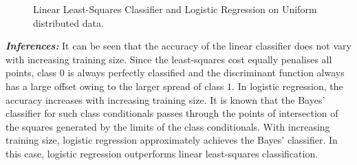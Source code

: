 \documentclass[12pt, a4 paper]{article}
\begin{document}
\begin{figure}

\caption{Linear Least-Squares Classifier and Logistic Regression on Uniform distributed data.}
\label{fig:LS_LOG_Uniform}
\end{figure}

{\it \bfseries Inferences:} It can be seen that the accuracy of the linear classifier does not vary with increasing training size. Since the least-squares cost equally penalises all points, class $0$ is always perfectly classified and the discriminant function always has a large offset owing to the larger spread of class $1$. In logistic regression, the accuracy increases with increasing training size. It is known that the Bayes' classifier for such class conditionals passes through the points of intersection of the squares generated by the limits of the class conditionals. With increasing training size, logistic regression approximately achieves the Bayes' classifier. In this case, logistic regression outperforms linear least-squares classification. \\
\end{document}
